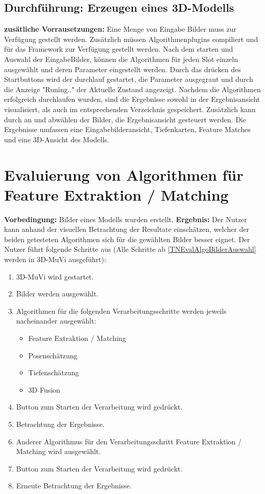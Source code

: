 \subsection{Durchführung: Erzeugen eines 3D-Modells}
\textbf{zusätliche Vorrausetzungen:} Eine Menge von Eingabe Bilder muss zur Verfügung gestellt werden. Zusätzlich müssen Algorithmenplugins compiliert und für das Framework zur Verfügung gestellt werden.\newline
Nach dem starten und Auswahl der EingabeBilder, können die Algorithmen für jeden Slot einzeln ausgewählt und deren Parameter eingestellt werden. \newline
Durch das drücken des Startbuttons wird der durchlauf gestartet, die Parameter ausgegraut und durch die Anzeige "Runing.." der Aktuelle Zustand angezeigt.
Nachdem die Algorithmen erfolgreich durchlaufen wurden, sind die Ergebnisse sowohl in der Ergebnisansicht visualisiert, als auch im entsprechenden Verzeichnis gespeichert. \newline
Zusätzlich kann durch an und abwählen der Bilder, die Ergebnisansicht gesteuert werden.
Die Ergebnisse umfassen eine Eingabebilderansicht, Tiefenkarten, Feature Matches und eine 3D-Ansicht des Modells.


\section{Evaluierung von Algorithmen für Feature Extraktion / Matching}
\label{TNEvalAlgo}
\textbf{Vorbedingung:} Bilder eines Modells wurden erstellt. \newline
\textbf{Ergebnis:} Der Nutzer kann anhand der visuellen Betrachtung der Resultate einschätzen, welcher der beiden getesteten Algorithmen sich für die gewählten Bilder besser eignet. \newline
Der Nutzer führt folgende Schritte aus (Alle Schritte ab \ref{TNEvalAlgoBilderAuswahl} werden in 3D-MuVi ausgeführt):
\begin{enumerate}
	\item 3D-MuVi wird gestartet.
	\item \label{TNEvalAlgoBilderAuswahl} Bilder werden ausgewählt.
	\item Algorithmen für die folgenden Verarbeitungsschritte werden jeweils nacheinander ausgewählt:
	\begin{itemize}
		\item Feature Extraktion / Matching
		\item Posenschätzung
		\item Tiefenschätzung
		\item 3D Fusion
	\end{itemize}
	\item Button zum Starten der Verarbeitung wird gedrückt.
	\item Betrachtung der Ergebnisse.
	\item Anderer Algorithmus für den Verarbeitungsschritt Feature Extraktion / Matching wird ausgewählt.
	\item Button zum Starten der Verarbeitung wird gedrückt.
	\item Erneute Betrachtung der Ergebnisse.
\end{enumerate}
